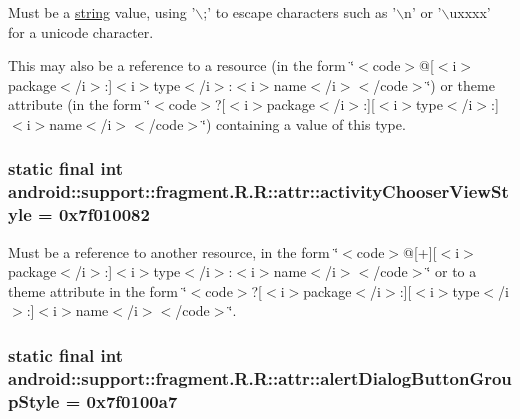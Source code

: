 Must be a \hyperlink{classandroid_1_1support_1_1fragment_1_1_r_1_1string}{string} value, using '$\backslash$;' to escape characters such as '$\backslash$n' or '$\backslash$uxxxx' for a unicode character. 

This may also be a reference to a resource (in the form \char`\"{}$<$code$>$@\mbox{[}$<$i$>$package$<$/i$>$:\mbox{]}$<$i$>$type$<$/i$>$:$<$i$>$name$<$/i$>$$<$/code$>$\char`\"{}) or theme attribute (in the form \char`\"{}$<$code$>$?\mbox{[}$<$i$>$package$<$/i$>$:\mbox{]}\mbox{[}$<$i$>$type$<$/i$>$:\mbox{]}$<$i$>$name$<$/i$>$$<$/code$>$\char`\"{}) containing a value of this type. \hypertarget{classandroid_1_1support_1_1fragment_1_1_r_1_1attr_178f46228fd4a952798429094ec1a3e0}{
\subsubsection[{activityChooserViewStyle}]{\setlength{\rightskip}{0pt plus 5cm}static final int android::support::fragment.R.R::attr::activityChooserViewStyle = 0x7f010082}}
\label{classandroid_1_1support_1_1fragment_1_1_r_1_1attr_178f46228fd4a952798429094ec1a3e0}


Must be a reference to another resource, in the form \char`\"{}$<$code$>$@\mbox{[}+\mbox{]}\mbox{[}$<$i$>$package$<$/i$>$:\mbox{]}$<$i$>$type$<$/i$>$:$<$i$>$name$<$/i$>$$<$/code$>$\char`\"{} or to a theme attribute in the form \char`\"{}$<$code$>$?\mbox{[}$<$i$>$package$<$/i$>$:\mbox{]}\mbox{[}$<$i$>$type$<$/i$>$:\mbox{]}$<$i$>$name$<$/i$>$$<$/code$>$\char`\"{}. \hypertarget{classandroid_1_1support_1_1fragment_1_1_r_1_1attr_3f6da75ecbe41df9aa73c5810a5cab32}{
\subsubsection[{alertDialogButtonGroupStyle}]{\setlength{\rightskip}{0pt plus 5cm}static final int android::support::fragment.R.R::attr::alertDialogButtonGroupStyle = 0x7f0100a7}}
\label{classandroid_1_1support_1_1fragment_1_1_r_1_1attr_3f6da75ecbe41df9aa73c5810a5cab32}


